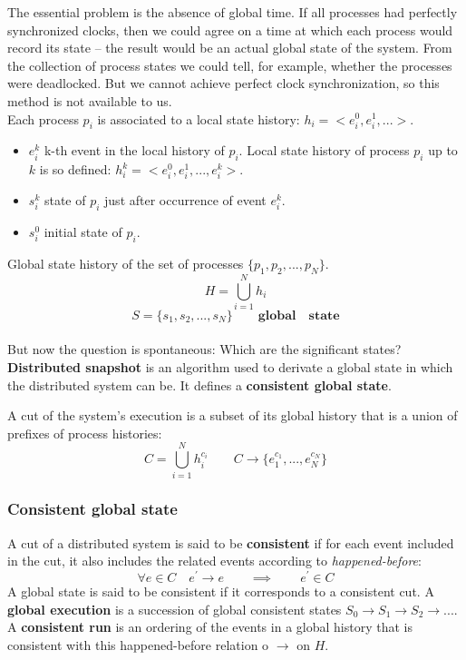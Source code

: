 \documentclass[11pt,a4paper]{article}
\begin{document}
The essential problem is the absence of global time. If all processes had perfectly synchronized clocks, then we could agree on a time at which each process would record its state – the result would be an actual global state of the system. From the collection of process states we could tell, for example, whether the processes were deadlocked. But we cannot achieve perfect clock synchronization, so this method is not available to us.\\

Each process $p_i$ is associated to a local state history: $h_i = <e_i^0,e_i^1,...>$. 
\begin{itemize}
	\item $e_i^k$ k-th event in the local history of $p_i$. Local state history of process $p_i$ up to $k$ is so defined: $h_i^k = <e_i^0, e_i^1,..., e_i^k>$.
	\item $s_i^k$ state of $p_i$ just after occurrence of event $e_i^k$.
	\item $s_i^0$ initial state of $p_i$.
\end{itemize}
Global state history of the set of processes $\{p_1,p_2,...,p_N\}$.
$$ H = \bigcup\limits_{i=1}^{N} h_{i}$$
$$ S = \{s_1, s_2,..., s_N\} \qquad \mathbf{global \quad state}$$\\
But now the question is spontaneous: Which are the significant states?\textbf{ Distributed snapshot} is an algorithm used to derivate a global state in which the distributed system can be. It defines a \textbf{consistent global state}.


A cut of the system’s execution is a subset of its global history that is a union of prefixes of process histories:
$$ C = \bigcup\limits_{i=1}^{N} h_{i}^{c_i} \qquad C \rightarrow \{e_1^{c_1},...,e_N^{c_N}\}$$

\subsubsection{Consistent global state}
A cut of a distributed system is said to be \textbf{consistent} if for each event included in the cut, it also includes the related events according to \textit{happened-before}:
$$\forall e \in C \quad e^{\prime} \rightarrow e \qquad \implies \qquad e^{\prime}\in C$$
A global state is said to be consistent if it corresponds to a consistent cut. A \textbf{global execution} is a succession of global consistent states $S_0 \rightarrow S_1 \rightarrow S_2 \rightarrow ... $. A \textbf{consistent run} is an ordering of the events in a global history that is consistent with this happened-before relation o $\rightarrow$ on $H$.
\end{document}
